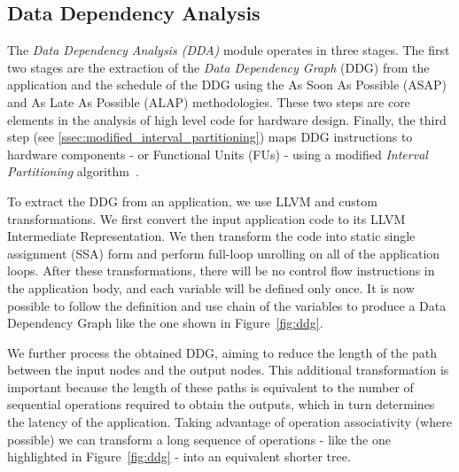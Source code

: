 \vspace{-1mm}
\subsection{Data Dependency Analysis}
\label{ssec:dda}
\vspace{-1mm}
The \textit{Data Dependency Analysis (DDA)} module operates in three stages. The first two stages are the extraction of the \textit{Data Dependency Graph} (DDG)\cite{isoda1983global} from the application and the schedule of the DDG using the As Soon As Possible (ASAP) and As Late As Possible (ALAP) methodologies. These two steps are core elements in the analysis of high level code for hardware design\cite{hwang1991formal}. Finally, the third step (see \ref{ssec:modified_interval_partitioning}) maps DDG instructions to hardware components - or Functional Units (FUs) - using a modified \textit{Interval Partitioning} algorithm~\cite{greedyIntervalPartitioning}.

To extract the DDG from an application, we use LLVM  and custom transformations. We first convert the input application code to its LLVM Intermediate Representation. We then transform the code into static single assignment (SSA) form and perform full-loop unrolling on all of the application loops. After these transformations, there will be no control flow instructions in the application body, and each variable will be defined only once. It is now possible to follow the definition and use chain of the variables to produce a Data Dependency Graph like the one shown in Figure~\ref{fig:ddg}.

We further process the obtained DDG, aiming to reduce the length of the path between the input nodes and the output nodes. This additional transformation is important because the length of these paths is equivalent to the number of sequential operations required to obtain the outputs, which in turn determines the latency of the application. Taking advantage of operation associativity (where possible) we can transform a long sequence of operations - like the one highlighted in Figure~\ref{fig:ddg} - into an equivalent shorter tree.

